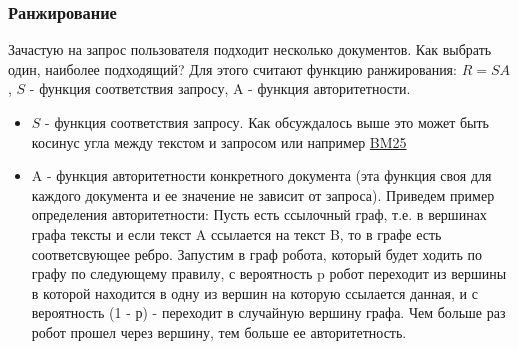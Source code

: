 \subsubsection {Ранжирование}
Зачастую на запрос пользователя подходит несколько документов. Как выбрать один, наиболее подходящий? Для этого считают функцию ранжирования: $R = S A$, $S$ - функция соответствия запросу, A - функция авторитетности. 
\begin{itemize}
\item $S$ - функция соответствия запросу. Как обсуждалось выше это может быть косинус угла между текстом и запросом или например \href{https://ru.wikipedia.org/wiki/Okapi_BM25}{BM25}
\item A - функция авторитетности конкретного документа (эта функция своя для каждого документа и ее значение не зависит от запроса). Приведем пример определения авторитетности: Пусть есть ссылочный граф, т.е. в вершинах графа тексты и если текст A ссылается на текст B, то в графе есть соответсвующее ребро. Запустим в граф робота, который будет ходить по графу по следующему правилу, с вероятность p робот переходит из вершины в которой находится в одну из вершин на которую ссылается данная, и с вероятность (1 - р) - переходит в случайную вершину графа. Чем больше раз робот прошел через вершину, тем больше ее авторитетность.
\end {itemize}



